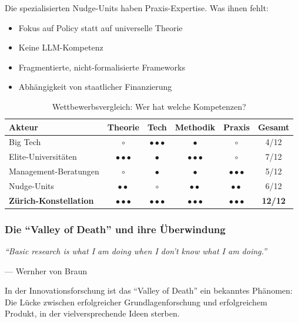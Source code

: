 Die spezialisierten Nudge-Units haben Praxis-Expertise. Was ihnen fehlt:
\begin{itemize}
    \item Fokus auf Policy statt auf universelle Theorie
    \item Keine LLM-Kompetenz
    \item Fragmentierte, nicht-formalisierte Frameworks
    \item Abhängigkeit von staatlicher Finanzierung
\end{itemize}

\begin{table}[h]
\centering
\caption{Wettbewerbsvergleich: Wer hat welche Kompetenzen?}
\label{tab:wettbewerb}
\begin{tabular}{@{}lccccc@{}}
\toprule
\textbf{Akteur} & \textbf{Theorie} & \textbf{Tech} & \textbf{Methodik} & \textbf{Praxis} & \textbf{Gesamt} \\
\midrule
Big Tech & $\circ$ & $\bullet\bullet\bullet$ & $\bullet$ & $\circ$ & 4/12 \\
Elite-Universitäten & $\bullet\bullet\bullet$ & $\bullet$ & $\bullet\bullet\bullet$ & $\circ$ & 7/12 \\
Management-Beratungen & $\circ$ & $\bullet$ & $\bullet$ & $\bullet\bullet\bullet$ & 5/12 \\
Nudge-Units & $\bullet\bullet$ & $\circ$ & $\bullet\bullet$ & $\bullet\bullet$ & 6/12 \\
\textbf{Zürich-Konstellation} & $\bullet\bullet\bullet$ & $\bullet\bullet\bullet$ & $\bullet\bullet\bullet$ & $\bullet\bullet\bullet$ & \textbf{12/12} \\
\bottomrule
\end{tabular}
\end{table}

\subsubsection{Die ``Valley of Death'' und ihre Überwindung}

\epigraph{\textit{``Basic research is what I am doing when I don't know what I am doing.''}}{--- Wernher von Braun}

In der Innovationsforschung ist das ``Valley of Death'' ein bekanntes Phänomen: Die Lücke zwischen erfolgreicher Grundlagenforschung und erfolgreichem Produkt, in der vielversprechende Ideen sterben.

